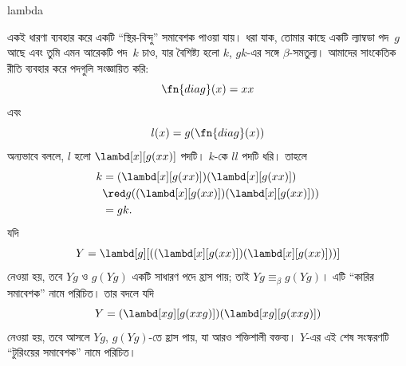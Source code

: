 \documentclass[../../../include/open-logic-section]{subfiles}
\begin{document}
\begin{tagblock}{lambda}
\begin{digress}
একই ধারণা ব্যবহার করে একটি “স্থির-বিন্দু” সমাবেশক পাওয়া যায়। ধরা যাক,
তোমার কাছে একটি ল্যাম্বডা পদ~$g$ আছে এবং তুমি এমন আরেকটি পদ~$k$ চাও,
যার বৈশিষ্ট্য হলো $k$, $gk$-এর সঙ্গে $\beta$-সমতুল্য। আমাদের সাংকেতিক
রীতি ব্যবহার করে পদগুলি সংজ্ঞায়িত করি:
\[
\fn{diag}(x) = xx
\]
এবং
\[
l(x) = g(\fn{diag}(x))
\]
অন্যভাবে বললে, $l$ হলো $\lambd[x][g(xx)]$ পদটি। $k$-কে $ll$ পদটি ধরি।
তাহলে
\begin{align*}
k & = (\lambd[x][g(xx)])(\lambd[x][g(xx)]) \\
& \red  g((\lambd[x][g(xx)])(\lambd[x][g(xx)])) \\
& = gk.
\end{align*}
যদি
\[
Y = \lambd[g][((\lambd[x][g(xx)])(\lambd[x][g(xx)]))]
\]
নেওয়া হয়, তবে $Yg$ ও $g(Yg)$ একটি সাধারণ পদে হ্রাস পায়; তাই
$Yg \equiv_\beta g(Yg)$। এটি “কারির সমাবেশক” নামে পরিচিত। তার বদলে যদি
\[
Y = (\lambd[xg][g(xxg)])(\lambd[xg][g(xxg)])
\]
নেওয়া হয়, তবে আসলে $Yg$, $g(Yg)$-তে হ্রাস পায়, যা আরও শক্তিশালী
বক্তব্য। $Y$-এর এই শেষ সংস্করণটি “টুরিংয়ের সমাবেশক” নামে পরিচিত।
\end{digress}
\end{tagblock}
\end{document}

